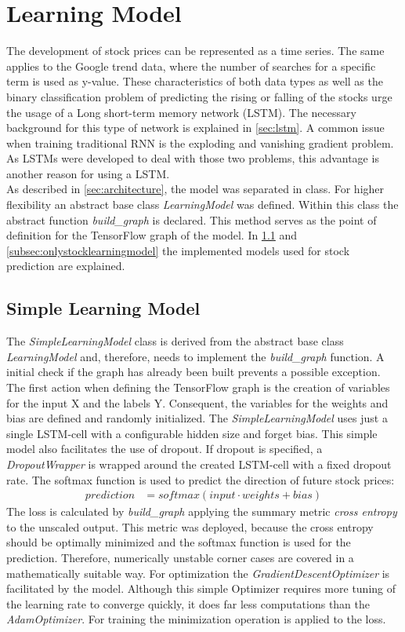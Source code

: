 \section{Learning Model}
\label{sec:model}
The development of stock prices can be represented as a time series. The same applies to the Google trend data, where the number of searches for a specific term is used as y-value. These characteristics of both data types as well as the binary classification problem of predicting the rising or falling of the stocks urge the usage of a Long short-term memory network (LSTM). The necessary background for this type of network is explained in \ref{sec:lstm}. A common issue when training traditional RNN is the exploding and vanishing gradient problem. As LSTMs were developed to deal with those two problems, this advantage is another reason for using a LSTM. 
\\
As described in \ref{sec:architecture}, the model was separated in class. For higher flexibility an abstract base class \textit{LearningModel} was defined. Within this class the abstract function \textit{build\_graph} is declared. This method serves as the point of definition for the TensorFlow graph of the model. In \ref{subsec:simplelearningmodel} and \ref{subsec:onlystocklearningmodel} the implemented models used for stock prediction are explained. 

\subsection{Simple Learning Model}
\label{subsec:simplelearningmodel}
The \textit{SimpleLearningModel} class is derived from the abstract base class \textit{LearningModel} and, therefore, needs to implement the \textit{build\_graph} function. A initial check if the graph has already been built prevents a possible exception. The first action when defining the TensorFlow graph is the creation of variables for the input X and the labels Y. Consequent, the variables for the weights and bias are defined and randomly initialized. The \textit{SimpleLearningModel} uses just a single LSTM-cell with a configurable hidden size and forget bias. This simple model also facilitates the use of dropout. If dropout is specified, a \textit{DropoutWrapper} is wrapped around the created LSTM-cell with a fixed dropout rate. The softmax function is used to predict the direction of future stock prices:
\begin{align}
prediction &= softmax(input \cdot weights + bias)
\end{align}
The loss is calculated by \textit{build\_graph} applying the summary metric \textit{cross entropy} to the unscaled output. This metric was deployed, because the cross entropy should be optimally minimized and the softmax function is used for the prediction. Therefore, numerically unstable corner cases are covered in a mathematically suitable way. For optimization the \textit{GradientDescentOptimizer} is facilitated by the model. Although this simple Optimizer requires more tuning of the learning rate to converge quickly, it does far less computations than the \textit{AdamOptimizer}. For training the minimization operation is applied to the loss. 

